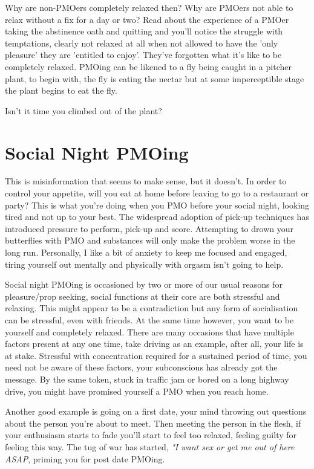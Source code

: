\documentclass[easypeasy.tex]{subfiles}
\begin{document}
Why are non-PMOers completely relaxed then? Why are PMOers not able to relax without a fix for a day or two? Read about the experience of a PMOer taking the abstinence oath and quitting and you'll notice the struggle with temptations, clearly not relaxed at all when not allowed to have the 'only pleasure' they are 'entitled to enjoy'. They've forgotten what it's like to be completely relaxed. PMOing can be likened to a fly being caught in a pitcher plant, to begin with, the fly is eating the nectar but at some imperceptible stage the plant begins to eat the fly.

Isn't it time you climbed out of the plant?

\section{Social Night PMOing}

This is misinformation that seems to make sense, but it doesn't. In order to control your appetite, will you eat at home before leaving to go to a restaurant or party? This is what you're doing when you PMO before your social night, looking tired and not up to your best. The widespread adoption of pick-up techniques has introduced pressure to perform, pick-up and score. Attempting to drown your butterflies with PMO and substances will only make the problem worse in the long run. Personally, I like a bit of anxiety to keep me focused and engaged, tiring yourself out mentally and physically with orgasm isn't going to help.

Social night PMOing is occasioned by two or more of our usual reasons for pleasure/prop seeking, social functions at their core are both stressful and relaxing. This might appear to be a contradiction but any form of socialisation can be stressful, even with friends. At the same time however, you want to be yourself and completely relaxed. There are many occasions that have multiple factors present at any one time, take driving as an example, after all, your life is at stake. Stressful with concentration required for a sustained period of time, you need not be aware of these factors, your subconscious has already got the message. By the same token, stuck in traffic jam or bored on a long highway drive, you might have promised yourself a PMO when you reach home.

Another good example is going on a first date, your mind throwing out questions about the person you're about to meet. Then meeting the person in the flesh, if your enthusiasm starts to fade you'll start to feel too relaxed, feeling guilty for feeling this way. The tug of war has started, \textit{"I want sex or get me out of here ASAP}, priming you for post date PMOing.
\end{document}
